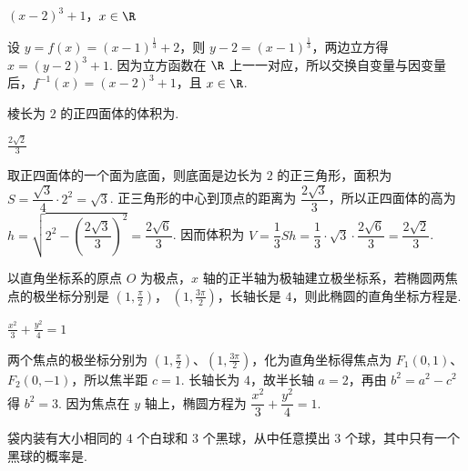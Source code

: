 \documentclass[UTF8,a4paper,oneside,11pt]{ctexbook}
\begin{document}
\begin{answer}
\((x-2)^3+1\)，\(x\in\R\)
\end{answer}

\begin{solution}
设 \(y=f(x)=(x-1)^{\frac13}+2\)，则 \(y-2=(x-1)^{\frac13}\)，两边立方得 \(x=(y-2)^3+1\). 因为立方函数在 \(\R\) 上一一对应，所以交换自变量与因变量后，\(f^{-1}(x)=(x-2)^3+1\)，且 \(x\in\R\).
\end{solution}

\begin{problem}
棱长为 \(2\) 的正四面体的体积为\fillinblank{}.
\end{problem}

\begin{answer}
\(\frac{2\sqrt{2}}{3}\)
\end{answer}

\begin{solution}
取正四面体的一个面为底面，则底面是边长为 \(2\) 的正三角形，面积为 \(S=\dfrac{\sqrt3}{4}\cdot2^2=\sqrt3\). 正三角形的中心到顶点的距离为 \(\dfrac{2\sqrt3}{3}\)，所以正四面体的高为
\(h=\sqrt{2^2-\left(\dfrac{2\sqrt3}{3}\right)^2}=\dfrac{2\sqrt6}{3}\). 因而体积为 \(V=\dfrac13Sh=\dfrac13\cdot\sqrt3\cdot\dfrac{2\sqrt6}{3}=\dfrac{2\sqrt2}{3}\).
\end{solution}

\begin{problem}
以直角坐标系的原点 \(O\) 为极点，\(x\) 轴的正半轴为极轴建立极坐标系，若椭圆两焦点的极坐标分别是 \(\left(1, \frac{\pi}{2}\right) \)， \(\left(1, \frac{3\pi}{2}\right) \)，长轴长是 \(4\)，则此椭圆的直角坐标方程是\fillinblank{}.
\end{problem}

\begin{answer}
\(\frac{x^2}{3}+\frac{y^2}{4}=1\)
\end{answer}

\begin{solution}
两个焦点的极坐标分别为 \(\left(1,\frac{\pi}{2}\right)\)、\(\left(1,\frac{3\pi}{2}\right)\)，化为直角坐标得焦点为 \(F_1(0,1)\)、\(F_2(0,-1)\)，所以焦半距 \(c=1\). 长轴长为 \(4\)，故半长轴 \(a=2\)，再由 \(b^2=a^2-c^2\) 得 \(b^2=3\). 因为焦点在 \(y\) 轴上，椭圆方程为 \(\dfrac{x^2}{3}+\dfrac{y^2}{4}=1\).
\end{solution}

\begin{problem}
袋内装有大小相同的 \(4\) 个白球和 \(3\) 个黑球，从中任意摸出 \(3\) 个球，其中只有一个黑球的概率是\fillinblank{}.
\end{problem}
\end{document}
